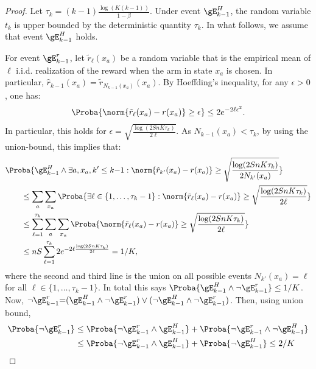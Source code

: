 \begin{subappendices}
\begin{proof}
    Let $\tau_k = (k-1)\frac{\log(K(k-1))}{1-\beta}$. Under event $\gE_{k-1}^H$, the random variable $t_k$ is upper bounded by the deterministic quantity $\tau_k$. In what follows, we assume that event $\gE_{k-1}^H$ holds.

    For event $\gE_{k-1}^r$, let $\tilde{r}_\ell(x_a)$ be a random variable that is the empirical mean of $\ell$ i.i.d. realization of the reward when the arm in state $x_a$ is chosen. In particular, ${\hat{r}_{k-1}(x_a) = \tilde{r}_{N_{k{-}1}(x_a)}(x_a)}$. By Hoeffding's inequality, for any $\epsilon>0$, one has:
    \begin{align*}
        \Proba{\norm{\tilde{r}_\ell(x_a) - r(x_a)} \ge \epsilon  } \le 2 e^{-2 \ell\epsilon^2}.
    \end{align*}
    In particular, this holds for $\epsilon=\sqrt{\frac{\log (2SnK\tau_k)}{2\ell}}$. As $N_{k-1}(x_a)< \tau_k$, by using the union-bound, this implies that: 
    \begin{align}
        &\Proba{\gE_{k-1}^H \land \exists a, x_a, k'\le k{-}1: \norm{\hat{r}_{k'}(x_a) - r(x_a)} \ge \sqrt{\frac{\log (2SnK\tau_k)}{2N_{k'}(x_a)}}}\label{eq:estR_k}\\
        &\qquad\le \sum_{a}\sum_{x_a}\Proba{\exists \ell\in\{1,\dots,\tau_k-1\}: \norm{\tilde{r}_{\ell}(x_a) - r(x_a)} \ge \sqrt{\frac{\log (2SnK\tau_k)}{2\ell}}}\nonumber\\
        &\qquad\le \sum_{\ell=1}^{\tau_k}\sum_a\sum_{x_a}\Proba{\norm{\tilde{r}_{\ell}(x_a) - r(x_a)} \ge \sqrt{\frac{\log (2SnK\tau_k)}{2\ell}}}\nonumber\\
        &\qquad\le  n S \sum_{\ell=1}^{\tau_k} 2e^{-2 \ell \frac{\log (2SnK\tau_k)}{2\ell}} =1/K,\nonumber
    \end{align}
    where the second and third  line is the union on all possible events $N_{k'}(x_a){=}\ell$ for all ${\ell{\in}\{1,\dots, \tau_k-1\}}$.
    In total this says $\Proba{\gE_{k-1}^H\land \lnot \gE_{k-1}^r}\le 1/K$.
    Now, $\lnot \gE_{k-1}^r {=}(\gE_{k-1}^H \land \lnot \gE_{k-1}^r) \lor (\lnot \gE_{k-1}^H \land \lnot \gE_{k-1}^r)$.
    Then, using union bound,
    \begin{align*}
        \Proba{\lnot \gE_{k-1}^r}
        &\le \Proba{\lnot \gE_{k-1}^r \land \gE_{k-1}^H} + \Proba{\lnot \gE_{k-1}^r \land \lnot \gE_{k-1}^H} \\
        &\le \Proba{\lnot \gE_{k-1}^r \land \gE_{k-1}^H} + \Proba{\lnot \gE_{k-1}^H} \le 2/K
    \end{align*}


\end{proof}
\end{subappendices}

